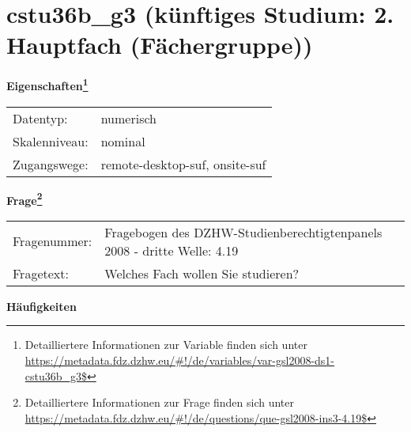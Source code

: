 
    \setcounter{footnote}{0}

    \vspace*{-1.8cm}
	\section{cstu36b\_g3 (künftiges Studium: 2. Hauptfach (Fächergruppe))}
	\label{section:cstu36b_g3}



    \vspace*{0.5cm}
    \noindent\textbf{Eigenschaften\footnote{Detailliertere Informationen zur Variable finden sich unter
		\url{https://metadata.fdz.dzhw.eu/\#!/de/variables/var-gsl2008-ds1-cstu36b_g3$}}}\\
	\begin{tabularx}{\hsize}{@{}lX}
	Datentyp: & numerisch \\
	Skalenniveau: & nominal \\
	Zugangswege: &
	  remote-desktop-suf, 
	  onsite-suf
 \\
    \end{tabularx}



				\vspace*{0.5cm}
                \noindent\textbf{Frage\footnote{Detailliertere Informationen zur Frage finden sich unter
		              \url{https://metadata.fdz.dzhw.eu/\#!/de/questions/que-gsl2008-ins3-4.19$}}}\\
				\begin{tabularx}{\hsize}{@{}lX}
					Fragenummer: &
					  Fragebogen des DZHW-Studienberechtigtenpanels 2008 - dritte Welle:
					  4.19
 \\
					Fragetext: & Welches Fach wollen Sie studieren? \\
				\end{tabularx}





        		\vspace*{0.5cm}
                \noindent\textbf{Häufigkeiten}

